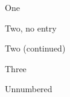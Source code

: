 \documentclass{article}
\newif\ifcaptioncontinued
\begin{document}
\listoffigures
\begin{figure}[h]\caption{One}\end{figure}
\begin{figure}[h]\caption[]{Two, no entry}\end{figure}
\begin{figure}[h]\captioncontinuedtrue\caption{Two (continued)}\end{figure}
\begin{figure}[h]
  \makeatletter
  \begin{minipage}{.4\linewidth}\caption@subfloat@begin
    \caption@subfloat@end\end{minipage}
  \makeatother
  \caption{Three}
\end{figure}
\begin{figure}[h]\caption*{Unnumbered}\end{figure}
\end{document}

